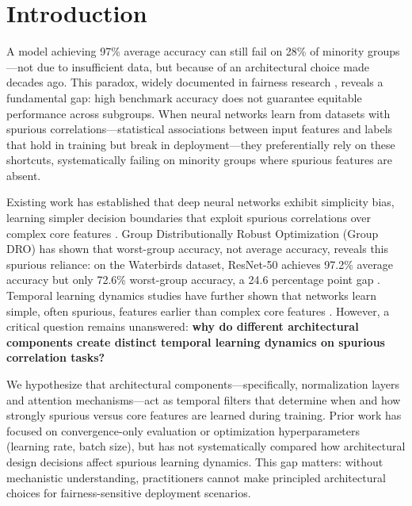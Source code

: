 \section{Introduction}

A model achieving 97\% average accuracy can still fail on 28\% of minority groups---not due to insufficient data, but because of an architectural choice made decades ago. This paradox, widely documented in fairness research \cite{sagawa2020distributionally, geirhos2020shortcut}, reveals a fundamental gap: high benchmark accuracy does not guarantee equitable performance across subgroups. When neural networks learn from datasets with spurious correlations---statistical associations between input features and labels that hold in training but break in deployment---they preferentially rely on these shortcuts, systematically failing on minority groups where spurious features are absent.

Existing work has established that deep neural networks exhibit simplicity bias, learning simpler decision boundaries that exploit spurious correlations over complex core features \cite{geirhos2020shortcut}. Group Distributionally Robust Optimization (Group DRO) has shown that worst-group accuracy, not average accuracy, reveals this spurious reliance: on the Waterbirds dataset, ResNet-50 achieves 97.2\% average accuracy but only 72.6\% worst-group accuracy, a 24.6 percentage point gap \cite{sagawa2020distributionally}. Temporal learning dynamics studies have further shown that networks learn simple, often spurious, features earlier than complex core features \cite{toneva2018empirical}. However, a critical question remains unanswered: \textbf{why do different architectural components create distinct temporal learning dynamics on spurious correlation tasks?}

We hypothesize that architectural components---specifically, normalization layers and attention mechanisms---act as temporal filters that determine when and how strongly spurious versus core features are learned during training. Prior work has focused on convergence-only evaluation or optimization hyperparameters (learning rate, batch size), but has not systematically compared how architectural design decisions affect spurious learning dynamics. This gap matters: without mechanistic understanding, practitioners cannot make principled architectural choices for fairness-sensitive deployment scenarios.

